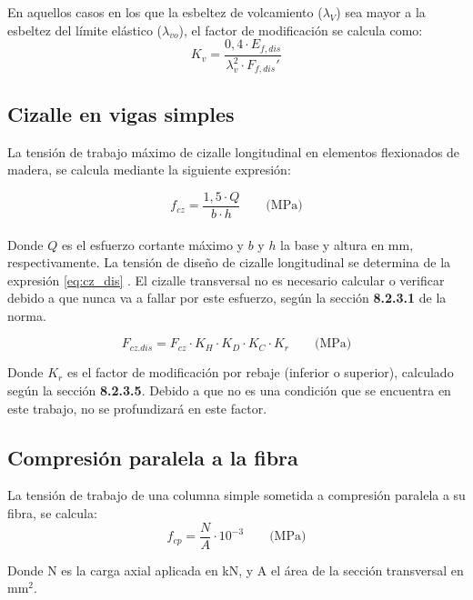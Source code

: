 En aquellos casos en los que la esbeltez de volcamiento ($\lambda_V$) sea mayor a la esbeltez del límite elástico ($\lambda_{vo}$), el factor de modificación se calcula como:
\begin{equation}\label{eq:k_v}
	K_v = \frac{0,4\cdot E_{f,dis}}{\lambda_{v}^2 \cdot F_{f,dis}'}
\end{equation}

\subsection{Cizalle en vigas simples}
La tensión de trabajo máximo de cizalle longitudinal en elementos flexionados de madera, se calcula mediante la siguiente expresión:

\begin{equation} \label{eq:f_cz}
f_{cz} = \frac{1,5 \cdot Q}{b \cdot h} \qquad \text{(MPa)}
\end{equation}
\\
Donde $Q$ es el esfuerzo cortante máximo y $b$ y $h$ la base y altura en mm, respectivamente. La tensión de diseño de cizalle longitudinal se determina de la expresión \ref{eq:cz_dis} . El cizalle transversal no es necesario calcular o verificar debido a que nunca va a fallar por este esfuerzo, según la sección \textbf{8.2.3.1} de la norma.

\begin{equation}\label{eq:cz_dis}
	F_{cz.dis} = F_{cz} \cdot K_H \cdot K_D \cdot K_C \cdot K_r \qquad \text{(MPa)}
\end{equation}

Donde $K_r$ es el factor de modificación por rebaje (inferior o superior), calculado según la sección \textbf{8.2.3.5}. Debido a que no es una condición que se encuentra en este trabajo, no se profundizará en este factor.\\


\subsection{Compresión paralela a la fibra}
\label{sec:cp}
La tensión de trabajo de una columna simple sometida a compresión paralela a su fibra, se calcula:
\begin{equation}\label{eq:f_cp}
	f_{cp}= \frac{N}{A} \cdot 10^{-3} \qquad \text{(MPa)}
\end{equation}

Donde N es la carga axial aplicada en kN, y A el área de la sección transversal en mm$^2$. 

